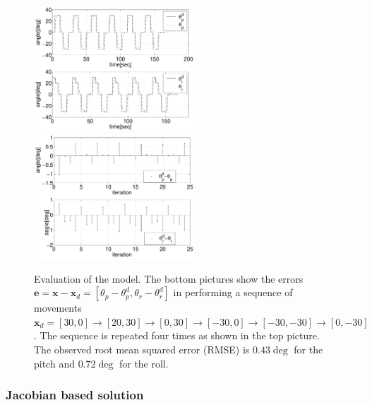 \documentclass[conference]{IEEEtran}
\numberwithin{equation}{section}
\newcommand{\x}{\mathbf{x}}
\begin{document}
\begin{figure}[tbp]
\centering 
\includegraphics[width=60mm]{image/AngleModel.pdf} 
\includegraphics[width=60mm]{image/ErrorsModel.pdf} 
\caption{Evaluation of the model. The bottom pictures show the errors $\mathbf e = \x - \x_d = [\theta_p - \theta_p^d, \theta_r - \theta_r^d]$ in performing a sequence of movements $\x_d = [30, 0] \rightarrow[20, 30] \rightarrow[0, 30] \rightarrow[-30, 0] \rightarrow[-30, -30] \rightarrow[0, -30]$. The sequence is repeated four times as shown in the top picture. The observed root mean squared error (RMSE) is $0.43 \deg$ for the pitch and $0.72 \deg$ for the roll.}
\label{Fig:ErrorModel}
\end{figure}

\subsubsection{Jacobian based solution} \label{Sec:JacobianSolution}
\end{document}
